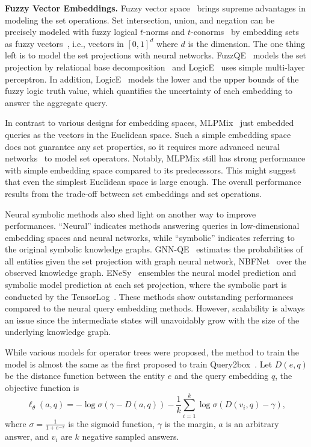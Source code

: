 \documentclass[11pt]{article}
\begin{document}
\noindent\textbf{Fuzzy Vector Embeddings.} Fuzzy vector space~\cite{Katsaras1977Fuzzyvector} brings supreme advantages in modeling the set operations. Set intersection, union, and negation can be precisely modeled with fuzzy logical $t$-norms and $t$-conorms~\cite{Hajek1998MetamathematicsFuzzy} by embedding sets as fuzzy vectors~\cite{Luus2021LogicEmbeddings,Chen2022FuzzyLogic}, i.e., vectors in $[0, 1]^d$ where $d$ is the dimension. The one thing left is to model the set projections with neural networks. FuzzQE~\cite{Chen2022FuzzyLogic} models the set projection by relational base decomposition~\cite{Schlichtkrull2018ModelingRelational} and LogicE~\cite{Luus2021LogicEmbeddings} uses simple multi-layer perceptron. In addition, LogicE~\cite{Luus2021LogicEmbeddings} models the lower and the upper bounds of the fuzzy logic truth value, which quantifies the uncertainty of each embedding to answer the aggregate query.

In contrast to various designs for embedding spaces, MLPMix~\cite{Amayuelas2022NeuralMethods} just embedded queries as the vectors in the Euclidean space. Such a simple embedding space does not guarantee any set properties, so it requires more advanced neural networks~\cite{tolstikhin2021mlp} to model set operators. Notably, MLPMix still has strong performance with simple embedding space compared to its predecessors. This might suggest that even the simplest Euclidean space is large enough. The overall performance results from the trade-off between set embeddings and set operations.

Neural symbolic methods also shed light on another way to improve performances. ``Neural'' indicates methods answering queries in low-dimensional embedding spaces and neural networks, while ``symbolic'' indicates referring to the original symbolic knowledge graphs. GNN-QE~\cite{Zhu2022NeuralSymbolicModelsa} estimates the probabilities of all entities given the set projection with graph neural network, NBFNet~\cite{Zhu2021NeuralBellmanForda} over the observed knowledge graph. ENeSy~\cite{Xu2022NeuralSymbolicEntangleda} ensembles the neural model prediction and symbolic model prediction at each set projection, where the symbolic part is conducted by the TensorLog~\cite{Cohen2020TensorLogProbabilistic}. These methods show outstanding performances compared to the neural query embedding methods. However, scalability is always an issue since the intermediate states will unavoidably grow with the size of the underlying knowledge graph.

While various models for operator trees were proposed, the method to train the model is almost the same as the first proposed to train Query2box~\cite{Ren2020Query2boxReasoning}. Let $D(e, q)$ be the distance function between the entity $e$ and the query embedding $q$, the objective function is
\begin{equation}
    \ell_\theta(a, q) = -\log \sigma( \gamma - D(a, q) ) - \frac{1}{k} \sum_{i=1}^k \log \sigma( D(v_i,  q) - \gamma),\label{eq:neg-sample}
\end{equation}
where $\sigma = \frac{1}{1+e^{-x}}$ is the sigmoid function, $\gamma$ is the margin, $a$ is an arbitrary answer, and $v_i$ are $k$ negative sampled answers.
\end{document}
